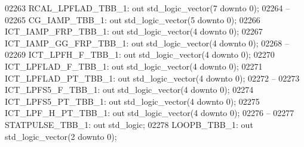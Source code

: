 \begin{DoxyCode}
02263     RCAL\_LPFLAD\_TBB\_1:  \textcolor{keywordflow}{out} \textcolor{comment}{std\_logic\_vector}(\textcolor{vhdllogic}{}\textcolor{vhdllogic}{7} \textcolor{keywordflow}{downto} \textcolor{vhdllogic}{}\textcolor{vhdllogic}{0});
02264 \textcolor{keyword}{    --}
02265     CG\_IAMP\_TBB\_1:  \textcolor{keywordflow}{out} \textcolor{comment}{std\_logic\_vector}(\textcolor{vhdllogic}{}\textcolor{vhdllogic}{5} \textcolor{keywordflow}{downto} \textcolor{vhdllogic}{}\textcolor{vhdllogic}{0});
02266     ICT\_IAMP\_FRP\_TBB\_1: \textcolor{keywordflow}{out} \textcolor{comment}{std\_logic\_vector}(\textcolor{vhdllogic}{}\textcolor{vhdllogic}{4} \textcolor{keywordflow}{downto} \textcolor{vhdllogic}{}\textcolor{vhdllogic}{0});
02267     ICT\_IAMP\_GG\_FRP\_TBB\_1:  \textcolor{keywordflow}{out} \textcolor{comment}{std\_logic\_vector}(\textcolor{vhdllogic}{}\textcolor{vhdllogic}{4} \textcolor{keywordflow}{downto} \textcolor{vhdllogic}{}\textcolor{vhdllogic}{0});
02268 \textcolor{keyword}{    --}
02269     ICT\_LPFH\_F\_TBB\_1:   \textcolor{keywordflow}{out} \textcolor{comment}{std\_logic\_vector}(\textcolor{vhdllogic}{}\textcolor{vhdllogic}{4} \textcolor{keywordflow}{downto} \textcolor{vhdllogic}{}\textcolor{vhdllogic}{0});
02270     ICT\_LPFLAD\_F\_TBB\_1: \textcolor{keywordflow}{out} \textcolor{comment}{std\_logic\_vector}(\textcolor{vhdllogic}{}\textcolor{vhdllogic}{4} \textcolor{keywordflow}{downto} \textcolor{vhdllogic}{}\textcolor{vhdllogic}{0});
02271     ICT\_LPFLAD\_PT\_TBB\_1:    \textcolor{keywordflow}{out} \textcolor{comment}{std\_logic\_vector}(\textcolor{vhdllogic}{}\textcolor{vhdllogic}{4} \textcolor{keywordflow}{downto} \textcolor{vhdllogic}{}\textcolor{vhdllogic}{0});
02272 \textcolor{keyword}{    --}
02273     ICT\_LPFS5\_F\_TBB\_1:  \textcolor{keywordflow}{out} \textcolor{comment}{std\_logic\_vector}(\textcolor{vhdllogic}{}\textcolor{vhdllogic}{4} \textcolor{keywordflow}{downto} \textcolor{vhdllogic}{}\textcolor{vhdllogic}{0});
02274     ICT\_LPFS5\_PT\_TBB\_1: \textcolor{keywordflow}{out} \textcolor{comment}{std\_logic\_vector}(\textcolor{vhdllogic}{}\textcolor{vhdllogic}{4} \textcolor{keywordflow}{downto} \textcolor{vhdllogic}{}\textcolor{vhdllogic}{0});
02275     ICT\_LPF\_H\_PT\_TBB\_1: \textcolor{keywordflow}{out} \textcolor{comment}{std\_logic\_vector}(\textcolor{vhdllogic}{}\textcolor{vhdllogic}{4} \textcolor{keywordflow}{downto} \textcolor{vhdllogic}{}\textcolor{vhdllogic}{0});
02276 \textcolor{keyword}{    --}
02277     STATPULSE\_TBB\_1:    \textcolor{keywordflow}{out} \textcolor{comment}{std\_logic};
02278     LOOPB\_TBB\_1:    \textcolor{keywordflow}{out} \textcolor{comment}{std\_logic\_vector}(\textcolor{vhdllogic}{}\textcolor{vhdllogic}{2} \textcolor{keywordflow}{downto} \textcolor{vhdllogic}{}\textcolor{vhdllogic}{0});

\end{DoxyCode}
